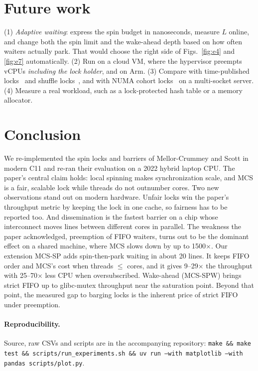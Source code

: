 \documentclass[10pt,twocolumn]{article}
\newcommand{\mcssp}{\textsc{MCS-SP}}
\begin{document}
\section{Future work}
\label{sec:future}
(1) \emph{Adaptive waiting}: express the spin budget in nanoseconds, measure $L$ online, and change both the
spin limit and the wake-ahead depth based on how often waiters actually park. That would choose the right
side of Figs.~\ref{fig:e4} and \ref{fig:e7} automatically. (2) Run on a cloud VM, where the hypervisor
preempts vCPUs \emph{including the lock holder}, and on Arm. (3) Compare with time-published locks~\cite{tp05}
and shuffle locks~\cite{shfl}, and with NUMA cohort locks~\cite{cohort} on a multi-socket server.
(4) Measure a real workload, such as a lock-protected hash table or a memory allocator.

\section{Conclusion}
We re-implemented the spin locks and barriers of Mellor-Crummey and Scott in modern C11 and re-ran their
evaluation on a 2022 hybrid laptop CPU. The paper's central claim holds: local spinning makes
synchronization scale, and MCS is a fair, scalable lock while threads do not outnumber cores. Two new
observations stand out on modern hardware. Unfair locks win the paper's throughput metric by keeping the lock
in one cache, so fairness has to be reported too. And dissemination is the fastest barrier on a chip
whose interconnect moves lines between different cores in parallel. The weakness the paper acknowledged,
preemption of FIFO waiters, turns out to be the dominant effect on a shared machine, where MCS slows down by
up to 1500$\times$. Our extension \mcssp{} adds spin-then-park waiting in about 20 lines. It keeps FIFO order
and MCS's cost when threads $\le$ cores, and it gives 9--29$\times$ the throughput with 25--70$\times$ less CPU
when oversubscribed. Wake-ahead (\mcssp{}W) brings strict FIFO up to glibc-mutex throughput near the
saturation point. Beyond that point, the measured gap to barging locks is the inherent price of strict FIFO under
preemption.

\paragraph{Reproducibility.} Source, raw CSVs and scripts are in the accompanying repository:
\texttt{make \&\& make test \&\& scripts/run\_experiments.sh \&\& uv run --with matplotlib --with pandas
scripts/plot.py}.
\end{document}
